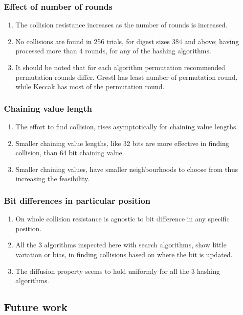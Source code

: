 \documentclass{beamer}
\begin{document}
\begin{frame}
\frametitle{Effect of number of rounds}
\begin{enumerate}
\item The collision resistance increases as the number of rounds is increased.
\item No collisions are found in 256 trials, for digest sizes 384 and above; having processed more than 4
rounds, for any of the hashing algorithms.
\item It should be noted that for each algorithm permutation recommended permutation rounds differ. Gr{\o}stl
has least number of permutation round, while Keccak has most of the permutation round.
\end{enumerate}
\end{frame}

\begin{frame}
\frametitle{Chaining value length}
\begin{enumerate}
\item The effort to find collision, rises asymptotically for chaining value lengths.
\item Smaller chaining value lengths, like 32 bits are more effective in finding collision, than 64 bit
chaining value.
\item Smaller chaining values, have smaller neighbourhoods to choose from thus increasing the feasibility.
\end{enumerate}
\end{frame}

\begin{frame}
\frametitle{Bit differences in particular position}
\begin{enumerate}
\item On whole collision resistance is agnostic to bit difference in any specific position.
\item All the 3 algorithms inspected here with search algorithms, show little variation or bias, in finding
collisions based on where the bit is updated.
\item The diffusion property seems to hold uniformly for all the 3 hashing algorithms.
\end{enumerate}
\end{frame}

\subsection{Future work}
\end{document}
